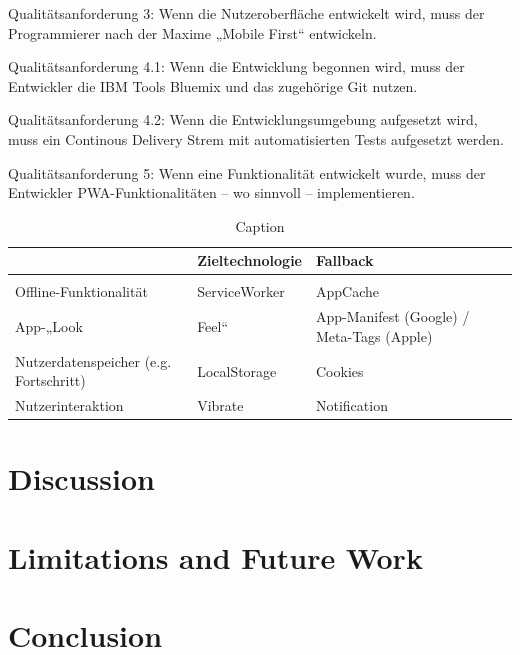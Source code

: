 Qualitätsanforderung 3: Wenn die Nutzeroberfläche entwickelt wird, muss der Programmierer nach der Maxime „Mobile First“ entwickeln. 


Qualitätsanforderung 4.1: Wenn die Entwicklung begonnen wird, muss der Entwickler die IBM Tools Bluemix und das zugehörige Git nutzen.


Qualitätsanforderung 4.2: Wenn die Entwicklungsumgebung aufgesetzt wird, muss ein Continous Delivery Strem mit automatisierten Tests aufgesetzt werden. 


Qualitätsanforderung 5: Wenn eine Funktionalität entwickelt wurde, muss der Entwickler PWA-Funktionalitäten – wo sinnvoll – implementieren.

\begin{table}[]
    \centering
    \begin{tabular}{|m{5.33cm}|m{5.33cm}|m{5.33cm}|}
    &   Zieltechnologie &   Fallback    \\
    \hline \\
Offline-Funktionalität  &	ServiceWorker   &   AppCache    \\
App-„Look & Feel“	&   App-Manifest (Google) / Meta-Tags (Apple) &  ~~~ \\
Nutzerdatenspeicher (e.g. Fortschritt)	&   LocalStorage    &   Cookies    \\
Nutzerinteraktion	&   Vibrate & Notification  & ~~~  \\
    \end{tabular}
    \caption{Caption}
    \label{tab:my_label}
\end{table}




\chapter{Discussion}


\chapter{Limitations and Future Work}


\chapter{Conclusion}

\begin{itemize}

\end{itemize}